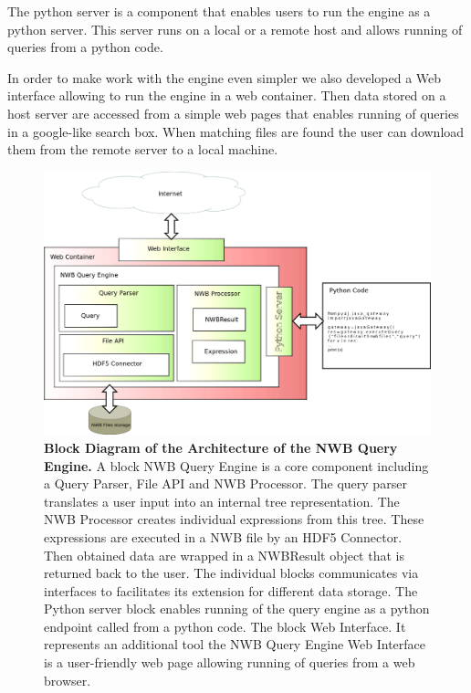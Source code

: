 \documentclass[utf8]{frontiersSCNS} %
\begin{document}
The python server is a component that enables users to run the engine as a python server. This server runs on a local or a remote host and allows running of queries from a python code.

In order to make work with the engine even simpler we also developed a Web interface allowing to run the engine in a web container. Then data stored on a host server are accessed from a simple web pages that enables running of queries in a google-like search box. When matching files are found the user can download them from the remote server to a local machine.

\begin{figure}
  \includegraphics[width=17cm]{architecture}
\caption{\textbf{Block Diagram of the Architecture of the NWB Query Engine. } A block NWB Query Engine is a core component including a Query Parser, File API and NWB Processor. The query parser translates a user input into an internal tree representation. The NWB Processor creates individual expressions from this tree. These expressions are executed in a NWB file by an HDF5 Connector. Then obtained data are wrapped in a NWBResult object that is returned back to the user. The individual blocks communicates via interfaces to facilitates its extension for different data storage. The Python server block enables running of the query engine as a python endpoint called from a python code. The block Web Interface. It represents an additional tool the NWB Query Engine Web Interface is a user-friendly web page allowing running of queries from a web browser.}
\label{fig:architecture}
\end{figure}
\end{document}
